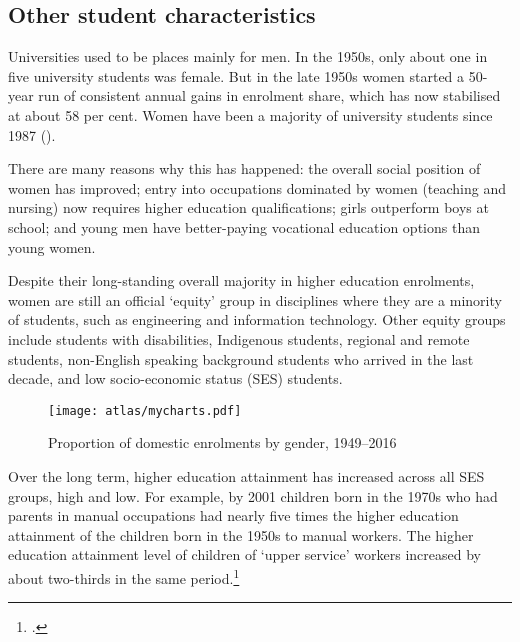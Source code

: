 \documentclass{grattan}
\begin{document}
%
\subsection{Other student characteristics }\label{subsec:other-student-characteristics}

Universities used to be places mainly for men. In the 1950s, only about one in five university students was female. But in the late 1950s women started a 50-year run of consistent annual gains in enrolment share, which has now stabilised at about 58 per cent. Women have been a majority of university students since 1987 ().

There are many reasons why this has happened: the overall social position of women has improved; entry into occupations dominated by women (teaching and nursing) now requires higher education qualifications; girls outperform boys at school; and young men have better-paying vocational education options than young women.

Despite their long-standing overall majority in higher education enrolments, women are still an official `equity' group in disciplines where they are a minority of students, such as engineering and information technology. Other equity groups include students with disabilities, Indigenous students, regional and remote students, non-English speaking background students who arrived in the last decade, and low socio-economic status (SES) students.


    \begin{figure} %
    \caption{Proportion of domestic enrolments by gender, 1949--2016}\label{fig:proportion-of-domestic-enrolments-by-gender-19492016}
    \texttt{[image: atlas/mycharts.pdf]}
    \end{figure}

Over the long term, higher education attainment has increased across all SES groups, high and low. For example, by 2001 children born in the 1970s who had parents in manual occupations had nearly five times the higher education attainment of the children born in the 1950s to manual workers. The higher education attainment level of children of `upper service' workers increased by about two-thirds in the same period.\footcite[][]{Marks2007australiachanges}
\end{document}
